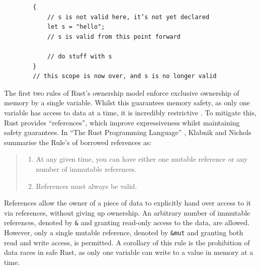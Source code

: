 \begin{code}
    \begin{verbatim}
        {
            // s is not valid here, it’s not yet declared
            let s = "hello";
            // s is valid from this point forward

            // do stuff with s
        }
        // this scope is now over, and s is no longer valid
    \end{verbatim}
    \caption{Rust program to demonstrate the scope of variables, derived from Listing 4-1 of Klabnik and Nichols' ``The Rust Programming Language'' \cite{RustProgrammingLanguage}.}
    \label{listing:rust-scope}
\end{code}

The first two rules of Rust's ownership model enforce exclusive ownership of memory by a single variable. Whilst this guarantees memory safety, as only one variable has access to data at a time, it is incredibly restrictive \cite{sautterOBSERVINGPARALLELEXECUTION}. To mitigate this, Rust provides ``references'', which improve expressiveness whilst maintaining safety guarantees. In ``The Rust Programming Language'' \cite{RustProgrammingLanguage}, Klabnik and Nichols summarise the Rule's of borrowed references as:

\begin{quote}
    \begin{enumerate}
        \item At any given time, you can have either one mutable reference or any number of immutable references.
        \item References must always be valid.
    \end{enumerate}
\end{quote}

References allow the owner of a piece of data to explicitly hand over access to it via references, without giving up ownership. An arbitrary number of immutable references, denoted by \texttt{&} and granting read-only access to the data, are allowed. However, only a single mutable reference, denoted by \texttt{&mut} and granting both read and write access, is permitted. A corollary of this rule is the prohibition of data races in safe Rust, as only one variable can write to a value in memory at a time.


